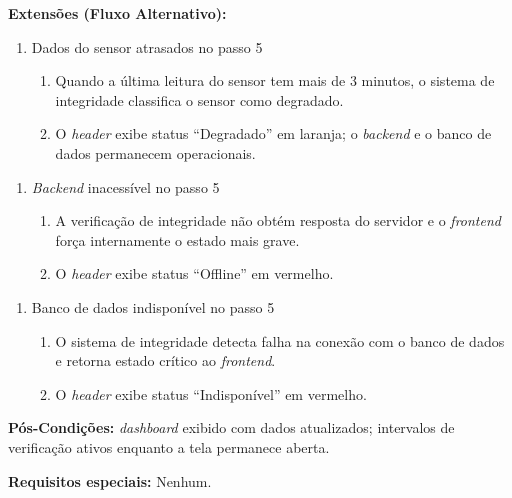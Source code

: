 \textbf{Extensões (Fluxo Alternativo):}

\begin{enumerate}
  \renewcommand{\theenumi}{5a}
  \renewcommand{\labelenumi}{\theenumi.}
  \item Dados do sensor atrasados no passo 5
  \begin{enumerate}
  \item Quando a última leitura do sensor tem mais de
        3 minutos, o sistema de integridade classifica
        o sensor como degradado.
  \item O \textit{header} exibe status ``Degradado''
        em laranja; o \textit{backend} e o banco de
        dados permanecem operacionais.
  \end{enumerate}
\end{enumerate}

\begin{enumerate}
  \renewcommand{\theenumi}{5b}
  \renewcommand{\labelenumi}{\theenumi.}
  \item \textit{Backend} inacessível no passo 5
  \begin{enumerate}
  \item A verificação de integridade não obtém resposta
        do servidor e o \textit{frontend} força
        internamente o estado mais grave.
  \item O \textit{header} exibe status ``Offline''
        em vermelho.
  \end{enumerate}
\end{enumerate}

\begin{enumerate}
  \renewcommand{\theenumi}{5c}
  \renewcommand{\labelenumi}{\theenumi.}
  \item Banco de dados indisponível no passo 5
  \begin{enumerate}
  \item O sistema de integridade detecta falha na
        conexão com o banco de dados e retorna estado
        crítico ao \textit{frontend}.
  \item O \textit{header} exibe status ``Indisponível''
        em vermelho.
  \end{enumerate}
\end{enumerate}

\textbf{Pós-Condições:} \textit{dashboard} exibido com dados
atualizados; intervalos de verificação ativos enquanto
a tela permanece aberta.

\textbf{Requisitos especiais:} Nenhum.

